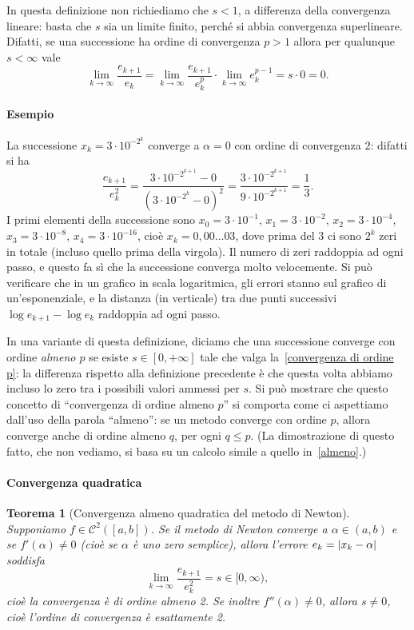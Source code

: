 \documentclass[a4paper]{report}
\DeclarePairedDelimiter{\abs}{\lvert}{\rvert}
\newtheorem{theorem}{Teorema}[chapter]
\theoremstyle{definition}
\theoremstyle{remark}
\begin{document}
In questa definizione non richiediamo che $s<1$, a differenza della convergenza lineare: basta che $s$ sia un limite finito, perché si abbia convergenza superlineare. Difatti, se una successione ha ordine di convergenza $p>1$ allora per qualunque $s<\infty$ vale
\begin{equation} \label{almeno}
\lim_{k \to \infty }\frac{e_{k+1}}{e_k} = \lim_{k \to \infty }\frac{e_{k+1}}{e_k^p} \cdot \lim_{k \to \infty } e_k^{p-1} = s \cdot 0 = 0.
\end{equation}

\paragraph{Esempio} La successione $x_k = 3\cdot 10^{-2^k}$ converge a $\alpha=0$ con ordine di convergenza $2$: difatti si ha
\[
\frac{e_{k+1}}{e_k^2} = \frac{3\cdot 10^{-2^{k+1}}-0}{(3\cdot 10^{-2^k} - 0)^2} = \frac{3\cdot 10^{-2^{k+1}}}{9\cdot 10^{-2^{k+1}}} = \frac13.
\]
I primi elementi della successione sono $x_0 = 3\cdot 10^{-1}$, $x_1 = 3\cdot 10^{-2}$, $x_2 = 3\cdot 10^{-4}$, $x_3 = 3\cdot 10^{-8}$, $x_4 = 3\cdot 10^{-16}$, cioè $x_k = 0{,}00\dots03$, dove prima del $3$ ci sono $2^k$ zeri in totale (incluso quello prima della virgola). Il numero di zeri raddoppia ad ogni passo, e questo fa sì che la successione converga molto velocemente. Si può verificare che in un grafico in scala logaritmica, gli errori stanno sul grafico di un'esponenziale, e la distanza (in verticale) tra due punti successivi $\log e_{k+1} - \log e_k$ raddoppia ad ogni passo.

In una variante di questa definizione, diciamo che una successione converge con ordine \emph{almeno $p$} se esiste $s\in [0,+\infty]$ tale che valga la~\eqref{convergenza di ordine p}: la differenza rispetto alla definizione precedente è che questa volta abbiamo incluso lo zero tra i possibili valori ammessi per $s$. Si può mostrare che questo concetto di ``convergenza di ordine almeno $p$'' si comporta come ci aspettiamo dall'uso della parola ``almeno'': se un metodo converge con ordine $p$, allora converge anche di ordine almeno $q$, per ogni $q\leq p$. (La dimostrazione di questo fatto, che non vediamo, si basa su un calcolo simile a quello in~\eqref{almeno}.)

\paragraph{Convergenza quadratica} \begin{theorem}[Convergenza almeno quadratica del metodo di Newton]\label{thm:convnewton}
Supponiamo $f \in \mathcal{C}^2([a,b])$. Se il metodo di Newton converge a $\alpha \in (a,b)$ e se $f'(\alpha) \neq 0$ (cioè se $\alpha$ è uno \emph{zero semplice}), allora l'errore $e_k = \abs{x_k - \alpha}$ soddisfa
\[
\lim_{k\to \infty} \frac{e_{k+1}}{e_k^2} = s \in [0,\infty),
\]
cioè la convergenza è di ordine almeno 2. Se inoltre $f''(\alpha)\neq 0$, allora $s\neq 0$, cioè l'ordine di convergenza è \emph{esattamente} 2.
\end{theorem}
\end{document}
